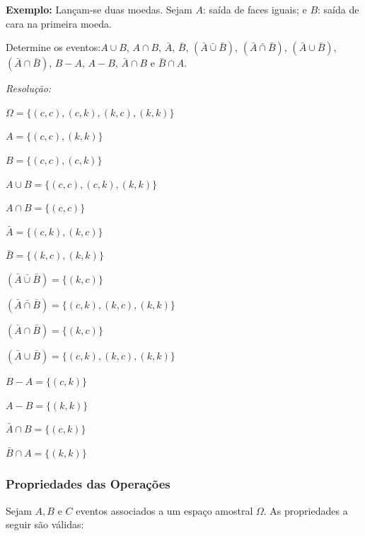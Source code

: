 \documentclass[oneside,a4paper,12pt]{article}
\begin{document}
{\bf Exemplo:} Lançam-se duas moedas. Sejam $A$: saída de faces iguais; e $B$: saída de cara na primeira moeda.

Determine os eventos:$A \cup B$, $A \cap B$, $\bar{A}$, $\bar{B}$, $(\bar{A}\bar{\cup}\bar{B})$, $(\bar{A}\bar{\cap}\bar{B})$, $(\bar{A}\cup\bar{B})$, $(\bar{A}\cap\bar{B})$, $B - A$, $A - B$, $\bar{A} \cap B$ e $\bar{B} \cap A$.

{\it Resolução:}

$\Omega = \{ (c,c), (c,k), (k,c), (k,k) \}$

$A = \{ (c,c), (k,k) \}$

$B = \{ (c,c), (c,k) \}$

$A\cup B = \{ (c,c), (c,k), (k,k)  \}$

$A\cap B = \{ (c,c)  \}$

$\bar{A} = \{ (c,k), (k,c) \}$

$\bar{B} = \{ (k,c), (k,k) \}$

$(\bar{A}\bar{\cup}\bar{B}) = \{ (k,c) \}$

$(\bar{A}\bar{\cap}\bar{B}) = \{ (c,k), (k,c), (k,k) \}$

$(\bar{A}\cap\bar{B}) = \{ (k,c) \}$

$(\bar{A}\cup\bar{B}) = \{ (c,k), (k,c), (k,k) \}$

$B - A = \{ (c,k) \}$

$A - B = \{ (k,k) \}$

$\bar{A}\cap B = \{ (c,k) \}$

$\bar{B} \cap A = \{ (k,k) \}$

\subsubsection{Propriedades das Operações}

 Sejam $A,B$ e $C$ eventos associados a um espaço amostral $\Omega$. As propriedades a seguir são válidas:
\end{document}
